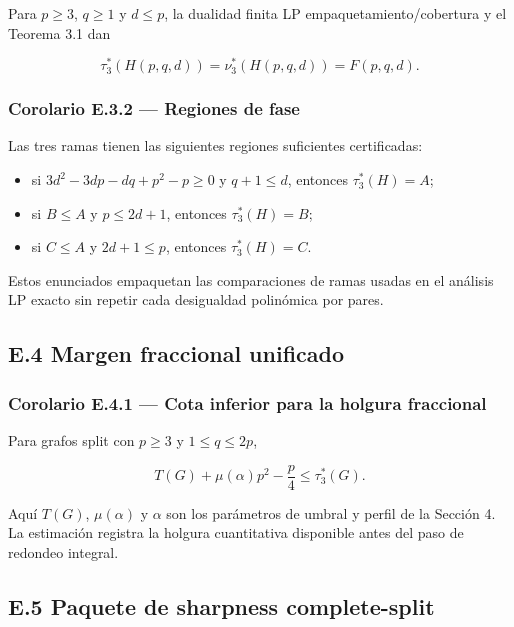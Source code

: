 \documentclass[spanish,11pt,a4paper]{article}
\providecommand{\tightlist}{\setlength{\itemsep}{0pt}\setlength{\parskip}{0pt}}
\begin{document}
Para \(p\ge3\), \(q\ge1\) y \(d\le p\), la dualidad finita LP
empaquetamiento/cobertura y el Teorema 3.1 dan

\[\tau_3^*(H(p,q,d))=\nu_3^*(H(p,q,d))=F(p,q,d).\]

\subsubsection{Corolario E.3.2 --- Regiones de
fase}\label{corolario-e.3.2-regiones-de-fase}

Las tres ramas tienen las siguientes regiones suficientes certificadas:

\begin{itemize}
\tightlist
\item
  si \(3d^2-3dp-dq+p^2-p\ge0\) y \(q+1\le d\), entonces
  \(\tau_3^*(H)=A\);
\item
  si \(B\le A\) y \(p\le2d+1\), entonces \(\tau_3^*(H)=B\);
\item
  si \(C\le A\) y \(2d+1\le p\), entonces \(\tau_3^*(H)=C\).
\end{itemize}

Estos enunciados empaquetan las comparaciones de ramas usadas en el
análisis LP exacto sin repetir cada desigualdad polinómica por pares.

\subsection{E.4 Margen fraccional
unificado}\label{e.4-margen-fraccional-unificado}

\subsubsection{Corolario E.4.1 --- Cota inferior para la holgura
fraccional}\label{corolario-e.4.1-cota-inferior-para-la-holgura-fraccional}

Para grafos split con \(p\ge3\) y \(1\le q\le2p\),

\[T(G)+\mu(\alpha)p^2-\frac p4\le\tau_3^*(G).\]

Aquí \(T(G)\), \(\mu(\alpha)\) y \(\alpha\) son los parámetros de umbral
y perfil de la Sección 4. La estimación registra la holgura cuantitativa
disponible antes del paso de redondeo integral.

\subsection{E.5 Paquete de sharpness
complete-split}\label{e.5-paquete-de-sharpness-complete-split}
\end{document}
